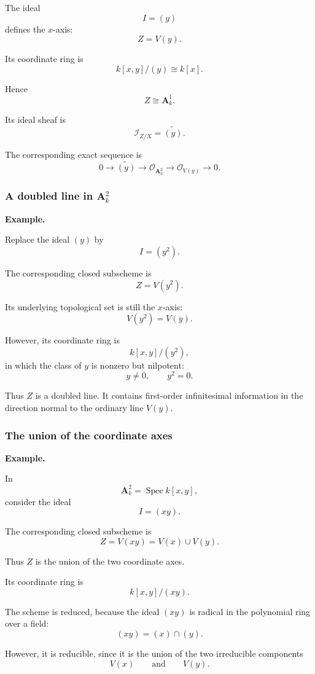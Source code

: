 The ideal
\[
I=(y)
\]
defines the \(x\)-axis:
\[
Z=V(y).
\]

Its coordinate ring is
\[
k[x,y]/(y)\cong k[x].
\]

Hence
\[
Z\cong\mathbf A^1_k.
\]

Its ideal sheaf is
\[
\mathcal I_{Z/X}=\widetilde{(y)}.
\]

The corresponding exact sequence is
\[
0
\longrightarrow
\widetilde{(y)}
\longrightarrow
\mathcal O_{\mathbf A^2_k}
\longrightarrow
\mathcal O_{V(y)}
\longrightarrow
0.
\]

\subsubsection{A doubled line in \(\mathbf A^2_k\)}

\textbf{Example.}

Replace the ideal \((y)\) by
\[
I=(y^2).
\]

The corresponding closed subscheme is
\[
Z=V(y^2).
\]

Its underlying topological set is still the \(x\)-axis:
\[
V(y^2)=V(y).
\]

However, its coordinate ring is
\[
k[x,y]/(y^2),
\]
in which the class of \(y\) is nonzero but nilpotent:
\[
y\neq0,
\qquad
y^2=0.
\]

Thus \(Z\) is a doubled line. It contains first-order infinitesimal information in the direction normal to the ordinary line \(V(y)\).

\subsubsection{The union of the coordinate axes}

\textbf{Example.}

In
\[
\mathbf A^2_k=\operatorname{Spec}k[x,y],
\]
consider the ideal
\[
I=(xy).
\]

The corresponding closed subscheme is
\[
Z=V(xy)=V(x)\cup V(y).
\]

Thus \(Z\) is the union of the two coordinate axes.

Its coordinate ring is
\[
k[x,y]/(xy).
\]

The scheme is reduced, because the ideal \((xy)\) is radical in the polynomial ring over a field:
\[
(xy)=(x)\cap(y).
\]

However, it is reducible, since it is the union of the two irreducible components
\[
V(x)
\qquad\text{and}\qquad
V(y).
\]

